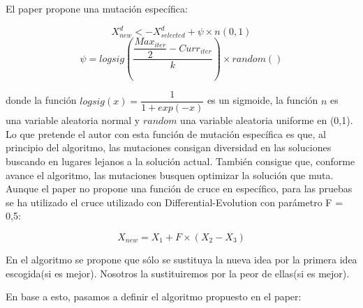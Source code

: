 El paper propone una mutación específica:

\[X^d_{new} <-X^d_{selected} + \psi \times n(0,1) \]
\[\psi = logsig\left(\dfrac{\dfrac{Max_{iter}}{2}-Curr_{iter}}{k}\right)\times random()\]

donde la función $logsig(x)=\dfrac{1}{1+exp(-x)}$ es un sigmoide, la función $n$ es una variable aleatoria normal y $random$ una variable aleatoria uniforme en (0,1). Lo que pretende el autor con esta función de mutación específica es que, al principio del algoritmo, las mutaciones consigan diversidad en las soluciones buscando en lugares lejanos a la solución actual. También consigue que, conforme avance el algoritmo, las mutaciones busquen optimizar la solución que muta.\\

Aunque el paper no propone una función de cruce en específico, para las pruebas se ha utilizado el cruce utilizado con Differential-Evolution con parámetro F = 0,5:

\[X_{new} = X_1 + F\times(X_2-X_3)\]

En el algoritmo se propone que sólo se sustituya la nueva idea por la primera idea escogida(si es mejor). Nosotros la sustituiremos por la peor de ellas(si es mejor).

En base a esto, pasamos a definir el algoritmo propuesto en el paper:\\

